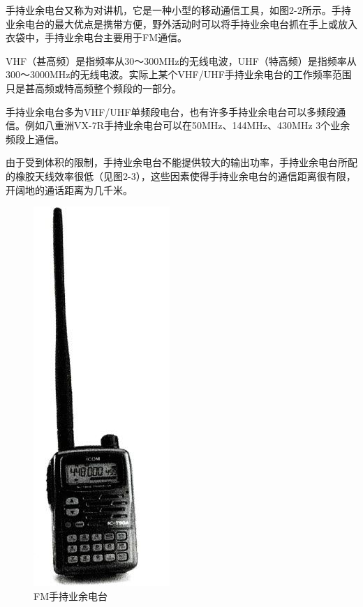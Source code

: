 \documentclass[12pt,UTF8]{ctexbook}
\begin{document}
手持业余电台又称为对讲机，它是一种小型的移动通信工具，如图2-2所示。手持业余电台的最大优点是携带方便，野外活动时可以将手持业余电台抓在手上或放入衣袋中，手持业余电台主要用于FM通信。

VHF（甚高频）是指频率从30～300MHz的无线电波，UHF（特高频）是指频率从300～3000MHz的无线电波。实际上某个VHF/UHF手持业余电台的工作频率范围只是甚高频或特高频整个频段的一部分。

手持业余电台多为VHF/UHF单频段电台，也有许多手持业余电台可以多频段通信。例如八重洲VX-7R手持业余电台可以在50MHz、144MHz、430MHz 3个业余频段上通信。

由于受到体积的限制，手持业余电台不能提供较大的输出功率，手持业余电台所配的橡胶天线效率很低（见图2-3），这些因素使得手持业余电台的通信距离很有限，开阔地的通话距离为几千米。

\begin{figure}[htbp]
	\centering
	\includegraphics[width=0.7\linewidth]{19}
	\caption{FM手持业余电台}
	\label{fig:1}
\end{figure}
\end{document}
